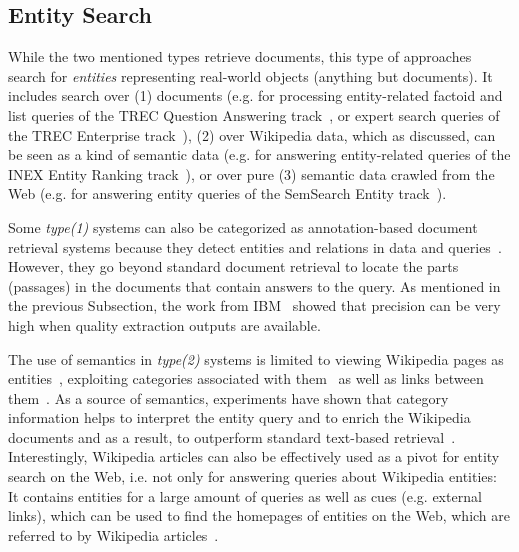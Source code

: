 \subsection{Entity Search} While the two mentioned types retrieve documents, this type of approaches search for \emph{entities} representing real-world objects (anything but documents). It includes search over (1) documents (e.g. for processing entity-related factoid and list queries of the TREC Question Answering track~\cite{DBLP:conf/sigir/Chu-CarrollPCFD06}, or expert search queries of the TREC Enterprise track~\cite{DBLP:journals/ipm/BalogAR09}), 
(2) over 
Wikipedia data, which as discussed, can be seen as a kind of semantic data (e.g. for answering entity-related queries of the INEX Entity Ranking track~\cite{DBLP:conf/cikm/KapteinSVK10,DBLP:conf/ecir/PehcevskiVT08}), or over pure (3) semantic data crawled from the Web (e.g. for answering entity queries of the SemSearch Entity track~\cite{DBLP:conf/semweb/BlancoMV11}).  

Some \emph{type(1)} systems can also be categorized as annotation-based document retrieval systems because they detect entities and relations in data and queries~\cite{DBLP:conf/vldb/ChengYC07,DBLP:conf/www/NieMSWM07,DBLP:conf/sigir/Chu-CarrollPCFD06}. However, they go beyond standard document retrieval to locate the parts (passages) in the documents that contain answers to the query. As mentioned in the previous Subsection, the work from IBM~\cite{DBLP:conf/sigir/Chu-CarrollPCFD06} showed that precision can be very high when quality extraction outputs are available. 

The use of semantics in \emph{type(2)} systems is limited to viewing Wikipedia pages as entities~\cite{DBLP:conf/cikm/KapteinSVK10}, exploiting categories associated with them~\cite{DBLP:journals/tois/BalogBR11} as well as links between them~\cite{DBLP:conf/ecir/PehcevskiVT08}. As a source of semantics, experiments have shown that category information helps to interpret the entity query and to enrich the Wikipedia documents and as a result, to outperform standard text-based retrieval~\cite{DBLP:conf/cikm/KapteinSVK10,DBLP:journals/tois/BalogBR11}. Interestingly, 
Wikipedia articles can also be effectively used as a pivot for entity search on the Web, i.e. not only for answering queries about Wikipedia entities: It contains entities for a large amount of queries as well as cues (e.g. external links), which can be used to find the homepages of entities on the Web, which are referred to by Wikipedia articles~\cite{DBLP:conf/cikm/KapteinSVK10}. 

